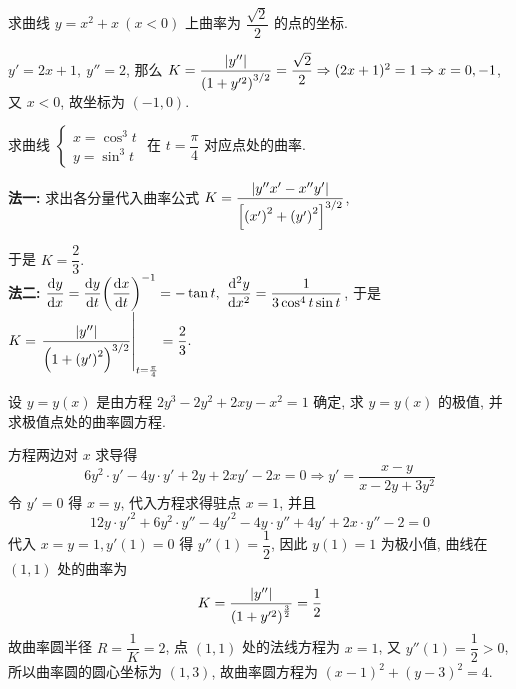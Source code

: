 \begin{example}[2012 数二]
    求曲线 $y=x^2+x~(x<0)$ 上曲率为 $\dfrac{\sqrt{2}}{2}$ 的点的坐标.
\end{example}
\begin{solution}
    $y'=2x+1,~y''=2$, 那么 $K=\dfrac{|y''|}{\qty(1+y'^2)^{3/2}}=\dfrac{\sqrt{2}}{2}\Rightarrow (2x+1)^2=1\Rightarrow x=0,-1$, 又 $x<0$, 故坐标为 $(-1,0).$
\end{solution}

\begin{example}[2018 数二]
    求曲线 $\begin{cases}
            x=\cos^3t \\y=\sin^3t
        \end{cases}$ 在 $t=\dfrac{\pi}{4}$ 对应点处的曲率.
\end{example}
\begin{solution}
    \textbf{法一: }求出各分量代入曲率公式 $K=\dfrac{|y''x'-x''y'|}{\qty[\qty(x')^2+\qty(y')^2]^{3/2}}$, 
    于是 $K=\dfrac{2}{3}.$\\
    \textbf{法二: }$\displaystyle \dv{y}{x}=\dv{y}{t}\qty(\dv{x}{t})^{-1}=-\tan t,~\dv[2]{y}{x}=\dfrac{1}{3\cos ^4t\sin t}$, 于是 $K=\eval{\dfrac{|y''|}{\qty(1+\qty(y')^2)^{3/2}}}_{t=\frac{\pi}{4}}=\dfrac{2}{3}.$
\end{solution}

\begin{example}
    设 $y=y(x)$ 是由方程 $2y^3-2y^2+2xy-x^2=1$ 确定, 求 $y=y(x)$ 的极值, 并求极值点处的曲率圆方程.
\end{example}
\begin{solution}
    方程两边对 $x$ 求导得 $$
    6y^2\cdot y'-4y\cdot y'+2y+2xy'-2x=0\Rightarrow y'=\dfrac{x-y}{x-2y+3y^2}
    $$
    令 $y'=0$ 得 $x=y$, 代入方程求得驻点 $x=1$, 并且 
    $$
    12y\cdot y'^2+6y^2\cdot y''-4y'^2-4y\cdot y''+4y'+2x\cdot y''-2=0
    $$
    代入 $x=y=1,y'(1)=0$ 得 $y''(1)=\dfrac{1}{2}$, 因此 $y(1)=1$ 为极小值, 曲线在 $(1,1)$ 处的曲率为 $$
    K=\dfrac{|y''|}{\qty(1+y'^2)^{\frac{3}{2}}}=\dfrac{1}{2}
    $$
    故曲率圆半径 $R=\dfrac{1}{K}=2$, 点 $(1,1)$ 处的法线方程为 $x=1$, 又 $y''(1)=\dfrac{1}{2}>0$, 所以曲率圆的圆心坐标为 $(1,3)$, 故曲率圆方程为 $(x-1)^2+(y-3)^2=4.$
\end{solution}

